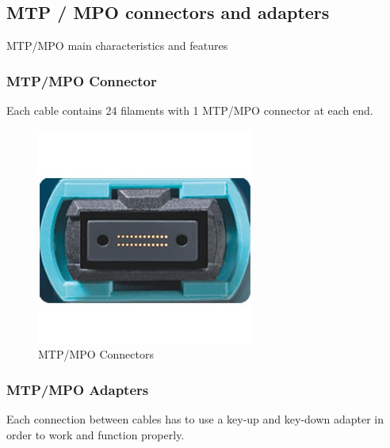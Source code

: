 \subsection{MTP / MPO connectors and adapters}

MTP/MPO main characteristics and features

\subsubsection{MTP/MPO Connector}

Each cable contains 24 filaments with 1 MTP/MPO connector at each end.

\begin{figure}
  \includegraphics[width=\textwidth]{images/3.jpg}
  \caption{MTP/MPO Connectors}
  \label{fig:jlsimon}
\end{figure}

\subsubsection{MTP/MPO Adapters}

Each connection between cables has to use a key-up and key-down adapter in order to work and function properly.

